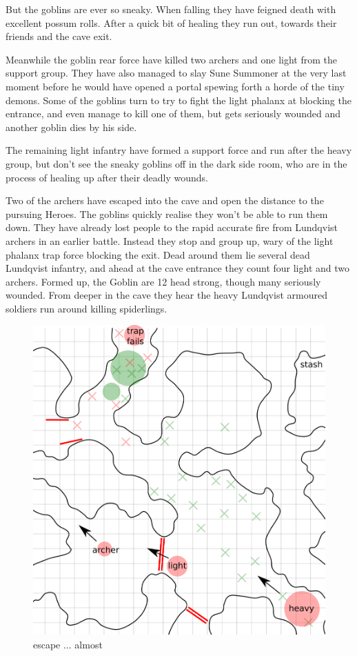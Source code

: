 But the goblins are ever so sneaky. When falling they have feigned death with excellent possum rolls. After a quick bit of healing they run out, towards their friends and the cave exit.

Meanwhile the goblin rear force have killed two archers and one light from the support group. They have also managed to slay Sune Summoner at the very last moment before he would have opened a portal spewing forth a horde of the tiny demons.
Some of the goblins turn to try to fight the light phalanx at blocking the entrance, and even manage to kill one of them, but gets seriously wounded and another goblin dies by his side.

The remaining light infantry have formed a support force and run after the heavy group, but don't see the sneaky goblins off in the dark side room, who are in the process of healing up after their deadly wounds. 

Two of the archers have escaped into the cave and open the distance to the pursuing Heroes. The goblins quickly realise they won't be able to run them down. They have already lost people to the rapid accurate fire from Lundqvist archers in an earlier battle. Instead they stop and group up, wary of the light phalanx trap force blocking the exit.
Dead around them lie several dead Lundqvist infantry, and ahead at the cave entrance they count four light and two archers. Formed up, the Goblin are 12 head strong, though many seriously wounded. From deeper in the cave they hear the heavy Lundqvist armoured soldiers run around killing spiderlings. 


\begin{figure}    %
\centering
\includegraphics[width=0.9\linewidth]{./fig/hool2lundqvistresult4-zoom.png}
\caption*{escape ... almost}
\end{figure}


